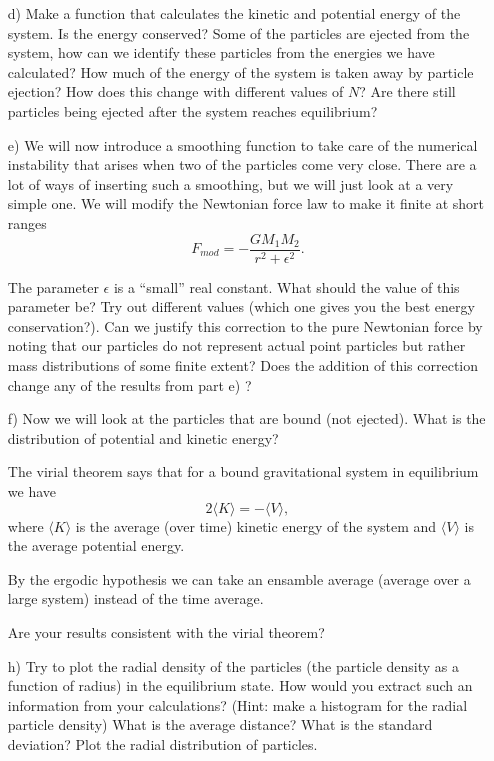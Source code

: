 \documentclass[11pt,a4wide]{article}
\begin{document}
\begin{enumerate}
\item[d)] Make a function that calculates the kinetic and potential
  energy of the system. Is the energy conserved? Some of the
  particles are ejected from the system, how can we identify these
  particles from the energies we have calculated? How much of the
  energy of the system is taken away by particle ejection? How does
  this change with different values of $N$? Are there still particles
  being ejected after the system reaches equilibrium?


\item[e)] We will now introduce a smoothing function to take care of
  the numerical instability that arises when two of the particles come
  very close. There are a lot of ways of inserting such a smoothing, but
  we will just look at a very simple one. We will modify the Newtonian
  force law to make it finite at short ranges
\[ F_{mod} = -\frac{GM_1M_2}{r^2 + \epsilon^2}.\]

The parameter $\epsilon$ is a ``small'' real constant. What should the value of this parameter be? Try out different values (which one gives you the best energy conservation?). Can we justify this correction to the pure Newtonian force by noting that our particles do not represent actual point particles
but rather mass distributions of some finite extent? Does the addition
of this correction change any of the results from part e) ?


\item[f)] Now we will look at the particles that are bound (not
  ejected). What is the distribution of potential and kinetic energy?

The virial theorem says that for a bound gravitational system in
equilibrium we have
\[
2\langle K\rangle = -\langle V \rangle,
\] 
where $\langle K\rangle$
is the average (over time) kinetic energy of the system and $ \langle V
\rangle$ is the average potential energy. 

By the ergodic hypothesis we can take an ensamble average (average over a large system) instead of the time average. 

Are your results consistent with the virial theorem? 

\item[h)]  Try to plot the radial density of the particles (the particle density as a function of radius) in the
  equilibrium state. How would you extract such an information from your calculations? (Hint: make a histogram for the radial
particle density) What is the average distance? What is the
  standard deviation? Plot the radial distribution of particles.


\end{enumerate}
\end{document}
